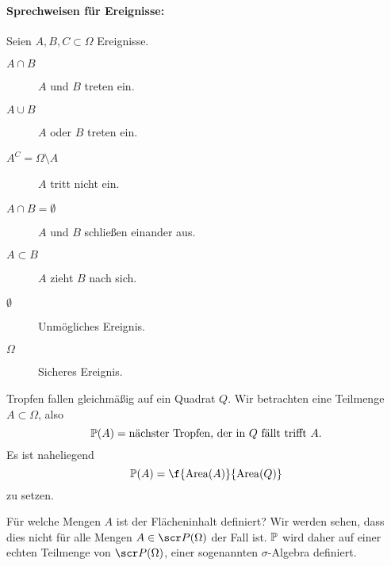 \paragraph{Sprechweisen für Ereignisse:}
Seien $A, B, C \subset \Omega$ Ereignisse.
\begin{description}
	\item[$A \cap B$]
		$A$ und $B$ treten ein.
	\item[$A \cup B$]
		$A$ oder $B$ treten ein.
	\item[$A^C = \Omega \setminus A$]
		$A$ tritt nicht ein.
	\item[$A \cap B = \emptyset$]
		$A$ und $B$ schließen einander aus.
	\item[$A \subset B$]
		$A$ zieht $B$ nach sich.
	\item[$\emptyset$]
		Unmögliches Ereignis.
	\item[$\Omega$]
		Sicheres Ereignis.
\end{description}

\begin{ex} \label{0.2.6}
	Tropfen fallen gleichmäßig auf ein Quadrat $Q$.
	Wir betrachten eine Teilmenge $A \subset \Omega$, also
	\[
		\P(A) = \text{nächster Tropfen, der in $Q$ fällt trifft $A$}.
	\]
	Es ist naheliegend
	\[
		\P(A)
		= \f {\Area(A)}{\Area(Q)}
	\]
	zu setzen.

	Für welche Mengen $A$ ist der Flächeninhalt definiert?
	Wir werden sehen, dass dies nicht für alle Mengen $A \in \scr P(\Omega)$ der Fall ist.
	$\P$ wird daher auf einer echten Teilmenge von $\scr P(\Omega)$, einer sogenannten $\sigma$-Algebra definiert.
\end{ex}

